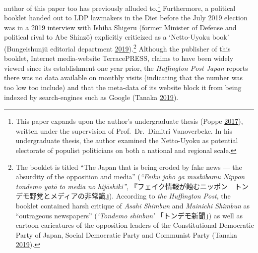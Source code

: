 \documentclass[10pt,british,A4paper,,openany]{memoir}
\begin{document}
author of this paper too has previously alluded to.\footnote{This paper
  expands upon the author's undergraduate thesis (Poppe
  \protect\hyperlink{ref-poppe_digitaal_2017}{2017}), written under the
  supervision of Prof.~Dr.~Dimitri Vanoverbeke. In his undergraduate
  thesis, the author examined the Netto-Uyoku as potential electorate of
  populist politicians on both a national and regional scale.}
Furthermore, a political booklet handed out to LDP lawmakers in the Diet
before the July 2019 election was in a 2019 interview with Ishiba
Shigeru (former Minister of Defense and political rival to Abe Shinzō)
explicitly criticized as a `Netto-Uyoku book' (Bungeishunjū editorial
department
\protect\hyperlink{ref-bungeishunju_editorial_department_eng._2019}{2019}).\footnote{The
  booklet is titled ``The Japan that is being eroded by fake news ---
  the absurdity of the opposition and media'' (\emph{``Feiku jōhō ga
  mushibamu Nippon tondemo yatō to media no hijōshiki''},
  『フェイク情報が蝕むニッポン　トンデモ野党とメディアの非常識』).
  According to \emph{the Huffington Post}, the booklet contained harsh
  critique of \emph{Asahi Shimbun} and \emph{Mainichi Shimbun} as
  ``outrageous newspapers'' (\emph{`Tondemo shinbun'} 「トンデモ新聞」)
  as well as cartoon caricatures of the opposition leaders of the
  Constitutional Democratic Party of Japan, Social Democratic Party and
  Communist Party (Tanaka
  \protect\hyperlink{ref-tanaka_eng._2019}{2019}).} Although the
publisher of this booklet, Internet media-website TerracePRESS, claims
to have been widely viewed since its establishment one year prior, the
\emph{Huffington Post Japan} reports there was no data available on
monthly visits (indicating that the number was too low too include) and
that the meta-data of its website block it from being indexed by
search-engines such as Google (Tanaka
\protect\hyperlink{ref-tanaka_eng._2019}{2019}).
\end{document}
